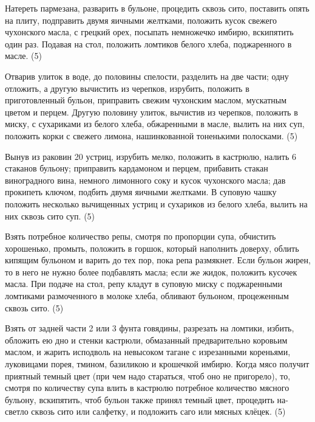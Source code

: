 
Натереть пармезана, разварить в бульоне, процедить сквозь сито, поставить опять на плиту, подправить двумя яичными желтками, положить кусок свежего чухонского масла, с грецкий орех, посыпать немножечко имбирю, вскипятить один раз. Подавая на стол, положить ломтиков белого хлеба, поджаренного в масле. (5)


Отварив улиток в воде, до половины спелости, разделить на две части; одну отложить, а другую вычистить из черепков, изрубить, положить в приготовленный бульон, приправить свежим чухонским маслом, мускатным цветом и перцем. Другую половину улиток, вычистив из черепков, положить в миску, с сухариками из белого хлеба, обжаренными в масле, вылить на них суп, положить корки с свежего лимона, нашинкованной тоненькими полосками. (5)


Вынув из раковин 20 устриц, изрубить мелко, положить в кастрюлю, налить 6 стаканов бульону; приправить кардамоном и перцем, прибавить стакан виноградного вина, немного лимонного соку и кусок чухонского масла; дав прокипеть ключом, подбить двумя яичными желтками. В суповую чашку положить несколько вычищенных устриц и сухариков из белого хлеба, вылить на них сквозь сито суп. (5)


Взять потребное количество репы, смотря по пропорции супа, обчистить хорошенько, промыть, положить в горшок, который наполнить доверху, облить кипящим бульоном и варить до тех пор, пока репа размякнет. Если бульон жирен, то в него не нужно более подбавлять масла; если же жидок, положить кусочек масла. При подаче на стол, репу кладут в суповую миску с поджаренными ломтиками размоченного в молоке хлеба, обливают бульоном, процеженным сквозь сито. (5)


Взять от задней части 2 или 3 фунта говядины, разрезать на ломтики, избить, обложить ею дно и стенки кастрюли, обмазанный предварительно коровьим маслом, и жарить исподволь на невысоком тагане с изрезанными кореньями, луковицами порея, тмином, базиликою и крошечкой имбирю. Когда мясо получит приятный темный цвет (при чем надо стараться, чтоб оно не пригорело), то, смотря по количеству супа влить в кастрюлю потребное количество мясного бульону, вскипятить, чтоб бульон также принял темный цвет, процедить на-светло сквозь сито или салфетку, и подложить саго или мясных клёцек. (5)

